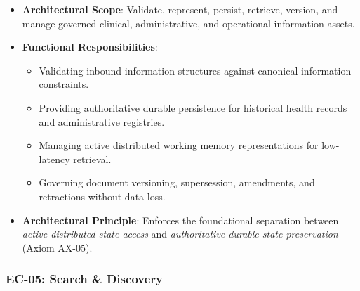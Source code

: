 \begin{itemize}

\item 
\textbf{Architectural Scope}: Validate, represent, persist, retrieve, version, and manage governed clinical, administrative, and operational information assets.



\item 
\textbf{Functional Responsibilities}:


\begin{itemize}

\item 
Validating inbound information structures against canonical information constraints.



\item 
Providing authoritative durable persistence for historical health records and administrative registries.



\item 
Managing active distributed working memory representations for low-latency retrieval.



\item 
Governing document versioning, supersession, amendments, and retractions without data loss.



\end{itemize}


\item 
\textbf{Architectural Principle}: Enforces the foundational separation between \emph{active distributed state access} and \emph{authoritative durable state preservation} (Axiom AX-05).



\end{itemize}
\label{rad:enterprise:139}
\subsubsection*{EC-05: Search \& Discovery}
\label{rad:enterprise:140}

